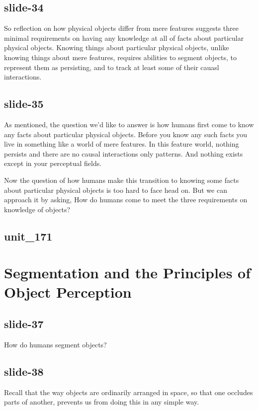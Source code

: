 \documentclass[12pt,\papersize]{extarticle}
\begin{document}
\subsection{slide-34}
So reflection on how physical objects differ from mere features suggests three minimal 
requirements on having any knowledge at all of facts about particular physical objects.
Knowing things about particular physical objects, unlike knowing things about mere features, 
requires abilities to segment objects, to represent them as persisting, and to track at least 
some of their cauasl interactions.
 
\subsection{slide-35}
As mentioned, the question we'd like to answer is how humans first come to know any facts about
particular physical objects.
Before you know any such facts you live in something like a world of mere features.
In this feature world, nothing persists and there are no causal interactions only patterns.
And nothing exists except in your perceptual fields.
 
Now the question of how humans make this transition to knowing some facts about particular 
physical objects is too hard to face head on.  But we can approach it by asking,
How do humans come to meet the three requirements on knowledge of objects?
 
\subsection{unit\_171}
 
 
\section{Segmentation and the Principles of Object Perception}
 
\subsection{slide-37}
How do humans segment objects?
 
\subsection{slide-38}
Recall that the way objects are ordinarily arranged in space, so that one occludes parts of another, prevents us from doing this in any simple way.
 
\end{document}
